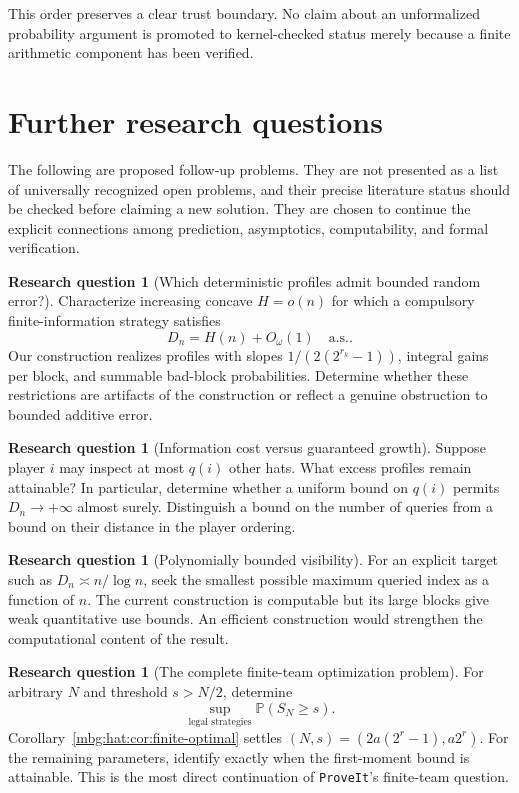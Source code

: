 \documentclass[11pt,letterpaper]{article}
\theoremstyle{definition}
\newcommand{\Prb}{\mathbb P}
\newcommand{\repo}{\texttt{ProveIt}}
\newcommand{\as}{\text{a.s.}}
\newtheorem{question}[theorem]{Research question}
\begin{document}
This order preserves a clear trust boundary. No claim about an
unformalized probability argument is promoted to kernel-checked
status merely because a finite arithmetic component has been
verified.

\section{Further research questions}
\label{mbg:hat:sec:questions}

The following are proposed follow-up problems. They are not presented
as a list of universally recognized open problems, and their precise
literature status should be checked before claiming a new solution.
They are chosen to continue the explicit connections among
prediction, asymptotics, computability, and formal verification.

\begin{question}[Which deterministic profiles admit bounded random error?]
Characterize increasing concave \(H=o(n)\) for which a compulsory
finite-information strategy satisfies
\[
  D_n=H(n)+O_\omega(1)\quad\as.
\]
Our construction realizes profiles with slopes
\(1/(2(2^{r_k}-1))\), integral gains per block, and summable bad-block
probabilities. Determine whether these restrictions are artifacts
of the construction or reflect a genuine obstruction to bounded
additive error.
\end{question}

\begin{question}[Information cost versus guaranteed growth]
Suppose player \(i\) may inspect at most \(q(i)\) other hats.
What excess profiles remain attainable? In particular, determine
whether a uniform bound on \(q(i)\) permits \(D_n\to+\infty\)
almost surely. Distinguish a bound on the number of queries from
a bound on their distance in the player ordering.
\end{question}

\begin{question}[Polynomially bounded visibility]
For an explicit target such as \(D_n\asymp n/\log n\), seek the
smallest possible maximum queried index as a function of \(n\).
The current construction is computable but its large blocks
give weak quantitative use bounds. An efficient construction
would strengthen the computational content of the result.
\end{question}

\begin{question}[The complete finite-team optimization problem]\label{mbg:hat:q:finiteteam}
For arbitrary \(N\) and threshold \(s>N/2\), determine
\[
  \sup_{\text{legal strategies}}\Prb(S_N\ge s).
\]
Corollary~\ref{mbg:hat:cor:finite-optimal} settles
\((N,s)=(2a(2^r-1),a2^r)\). For the remaining parameters,
identify exactly when the first-moment bound is attainable.
This is the most direct continuation of \repo's finite-team question.
\end{question}
\end{document}
